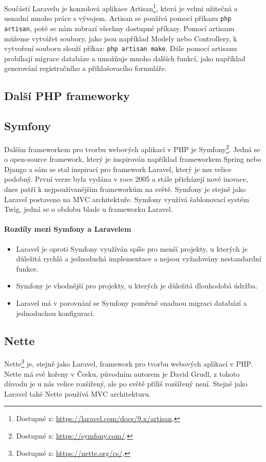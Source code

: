 Součástí Laravelu je konzolová aplikace Artisan\footnote{Dostupné z: \url{https://laravel.com/docs/9.x/artisan}.}, která je velmi užitečná a usnadní mnoho práce s vývojem. Artisan se používá pomocí příkazu \texttt{php artisan}, poté se nám zobrazí všechny dostupné příkazy. Pomocí artisanu můžeme vytvářet soubory, jako jsou například Modely nebo Controllery, k vytvoření souboru slouží příkaz: \texttt{php artisan make}. Dále pomocí artisanu probíhají migrace databáze a umožňuje mnoho dalších funkcí, jako například generování registračního a přihlašovacího formuláře. \cite{artisan}




\subsection{Další PHP frameworky}

\subsection*{Symfony}
Dalším frameworkem pro tvorbu webových aplikací v PHP je Symfony\footnote{Dostupné z: \url{https://symfony.com/}.}. Jedná se o open-source framework, který je inspirován například frameworkem Spring nebo Django a sám se stal inspirací pro framework Laravel, který je mu velice podobný. První verze byla vydána v roce 2005 a stále  přicházejí nové inovace, dnes patří k nejpoužívanějším frameworkům na světě. Symfony je stejně jako Laravel postaveno na MVC architektuře. Symfony využívá šablonovací systém Twig, jedná se o obdobu blade u frameworku Laravel. \cite{symfony}


\paragraph{Rozdíly mezi Symfony a Laravelem \cite{laravelsymfony}}
\begin{itemize}
  \item{Laravel je oproti Symfony využíván spíše pro menší projekty, u kterých je důležitá rychlá a jednoduchá implementace a nejsou vyžadovány nestandardní funkce.}
  \item{Symfony je vhodnější pro projekty, u kterých je důležitá dlouhodobá údržba.}
  \item{Laravel má v porovnání se Symfony poměrně snadnou migraci databází a jednoduchou konfiguraci.}
  
\end{itemize}


\subsection*{Nette}
Nette\footnote{Dostupné z: \url{https://nette.org/cs/}.} je, stejně jako Laravel, framework pro tvorbu webových aplikací v PHP. Nette má své kořeny v Česku, původním autorem je David Grudl, z tohoto důvodu je u nás velice rozšířený, ale po světě příliš rozšířený není. Stejně jako Laravel také Nette používá MVC architekturu.


